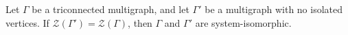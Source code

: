 Let $\Gamma$ be a triconnected multigraph, and let $\Gamma'$ be a multigraph with no isolated vertices. If $\mathcal{Z}(\Gamma') = \mathcal{Z}(\Gamma)$, then $\Gamma$ and $\Gamma'$ are system-isomorphic.
